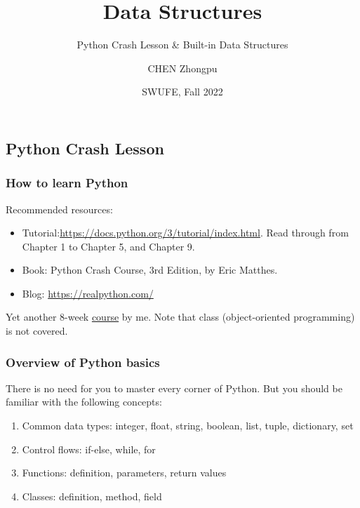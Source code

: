 \documentclass[aspectratio=169, 14pt]{beamer}
\title[Data Structures] %
{Data Structures}
\subtitle{Python Crash Lesson \& Built-in Data Structures}
\author[CHEN Zhongpu] %
{CHEN Zhongpu}
\institute[] %
{
	School of Computing and Artificial Intelligence \\
	\href{mailto:zpchen@swufe.edu.cn}{zpchen@swufe.edu.cn}
}
\date[] %
{SWUFE, Fall 2022}
\begin{document}
\frame{\titlepage}


{
	\begin{frame}
		\section{\textcolor{darkmidnightblue}{Python Crash Lesson}}
	\end{frame}
}

\begin{frame}
	\frametitle{How to learn Python}
	Recommended resources:

	\begin{itemize}
		\item {} Tutorial:\url{https://docs.python.org/3/tutorial/index.html}. Read through from Chapter 1 to Chapter 5, and Chapter 9.
		\item {} Book: Python Crash Course, 3rd Edition, by Eric Matthes.
		\item {} Blog: \url{https://realpython.com/}
	\end{itemize}
	Yet another 8-week \href{https://github.com/ChenZhongPu/python-swufe}{course} by me. Note that \alert{class} (object-oriented programming) is not covered.

\end{frame}

\begin{frame}
	\frametitle{Overview of Python basics}
	There is no need for you to master every corner of Python. But you should be familiar with the following concepts:
	\begin{enumerate}
		\item \alert{Common data types}: integer, float, string, boolean, list, tuple, dictionary, set
		\item \alert{Control flows}: if-else, while, for
		\item \alert{Functions}: definition, parameters, return values
		\item \alert{Classes}: definition, method, field
	\end{enumerate}
\end{frame}
\end{document}
